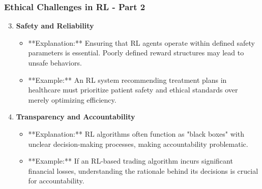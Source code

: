 \documentclass[aspectratio=169]{beamer}
\begin{document}
\begin{frame}[fragile]
    \frametitle{Ethical Challenges in RL - Part 2}
    \begin{enumerate}
        \setcounter{enumi}{2} %
        \item \textbf{Safety and Reliability}
            \begin{itemize}
                \item **Explanation:** Ensuring that RL agents operate within defined safety parameters is essential. Poorly defined reward structures may lead to unsafe behaviors.
                \item **Example:** An RL system recommending treatment plans in healthcare must prioritize patient safety and ethical standards over merely optimizing efficiency.
            \end{itemize}

        \item \textbf{Transparency and Accountability}
            \begin{itemize}
                \item **Explanation:** RL algorithms often function as "black boxes" with unclear decision-making processes, making accountability problematic.
                \item **Example:** If an RL-based trading algorithm incurs significant financial losses, understanding the rationale behind its decisions is crucial for accountability.
            \end{itemize}
    \end{enumerate}
\end{frame}
\end{document}
